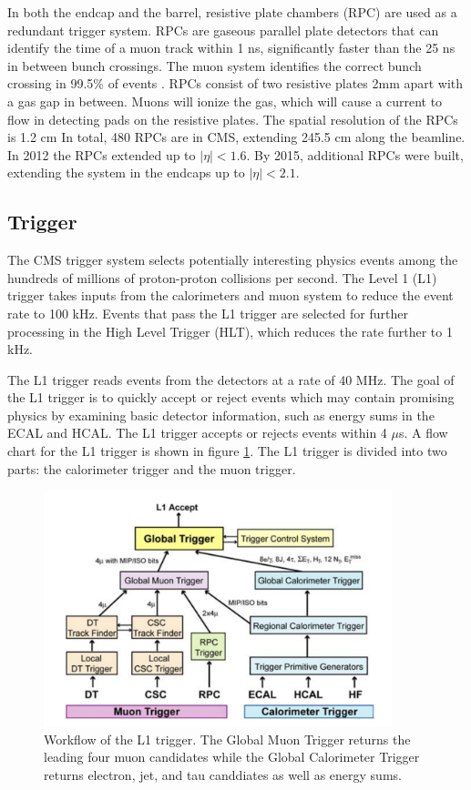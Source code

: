 \documentclass[oneside, letterpaper, oldfontcommands]{memoir}
\begin{document}
\qquad In both the endcap and the barrel, resistive plate chambers (RPC) are used as a redundant trigger system. RPCs are gaseous parallel plate detectors that can identify the time of a muon track within 1 ns,  significantly faster than the 25 ns in between bunch crossings. The muon system identifies the correct bunch crossing in 99.5\% of events \cite{Chatrchyan:2013sba}. RPCs consist of two resistive plates 2mm apart with a gas gap in between. Muons will ionize the gas, which will cause a current to flow in detecting pads on the resistive plates. The spatial resolution of the RPCs is 1.2 cm\cite{Chatrchyan:2013sba} In total, 480 RPCs are in CMS, extending 245.5 cm along the beamline. In 2012 the RPCs extended up to $|\eta| < 1.6$. By 2015, additional RPCs were built, extending the system in the endcaps up to $|\eta| < 2.1$.

\subsection{Trigger}\label{trigger}
\qquad The CMS trigger system selects potentially interesting physics events among the hundreds of millions of proton-proton collisions per second. The Level 1 (L1) trigger takes inputs from the calorimeters and muon system to reduce the event rate to 100 kHz. Events that pass the L1 trigger are selected for further processing in the  High Level Trigger (HLT), which reduces the rate further to 1 kHz.

\qquad The L1 trigger reads events from the detectors at a rate of 40 MHz. The goal of the L1 trigger is to quickly accept or reject events which may contain promising physics by examining basic detector information, such as energy sums in the ECAL and HCAL. The L1 trigger accepts or rejects events within 4 $\mu$s. A flow chart for the L1 trigger is shown in figure \ref{fig:L1Trigger}. The L1 trigger is divided into two parts: the calorimeter trigger and the muon trigger. 

\begin{figure}[here]
\includegraphics[width=0.9\textwidth]{L1trigger.png}
\caption{Workflow of the L1 trigger. The Global Muon Trigger returns the leading four muon candidates while the Global Calorimeter Trigger returns electron, jet, and tau canddiates as well as energy sums.\cite{1748-0221-3-08-S08001}}
\label{fig:L1Trigger}
\end{figure}
\end{document}
